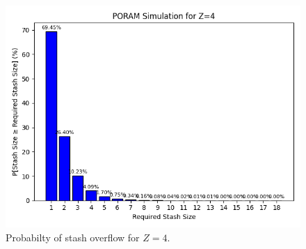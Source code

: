 \begin{figure}[H]
    \centering
    \includegraphics[width=\textwidth]{02-ex1/plot_z_4.png}
    \caption{Probabilty of stash overflow for $Z=4$.}
    \label{fig:stash-overflow-for-Z=4}
\end{figure}

